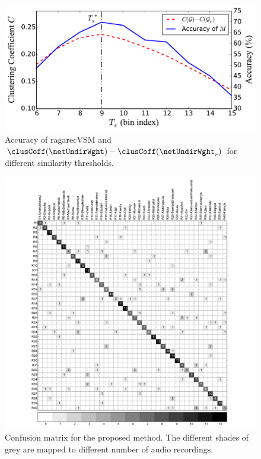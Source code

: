\begin{figure}
	\begin{center}
		\includegraphics[width=\figSizeEighty]{ch07_ragaRecognition/figures/accuracy_Vs_thresold.pdf}
	\end{center}
	\caption{Accuracy of \acrshort{ragarecVSM} and $\clusCoff(\netUndirWght)-\clusCoff(\netUndirWght_r)$ for different similarity thresholds.}
	\label{fig:performance_across_thresholds}
\end{figure}

\begin{figure}
	\begin{center}
		\includegraphics[width=\figSizeHundred]{ch07_ragaRecognition/figures/cnf_mtx_40raga_with_annotation.pdf}
	\end{center}
	\caption{Confusion matrix for the proposed method. The different shades of grey are mapped to different number of audio recordings.}
	\label{fig:confusion_matrix}
\end{figure}

